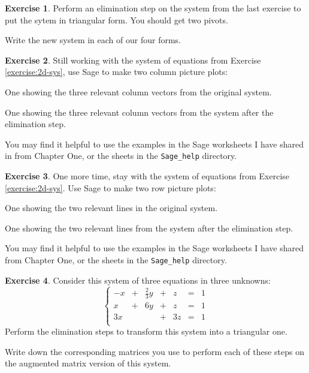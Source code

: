 \documentclass[11pt]{amsart}
\theoremstyle{definition}
\newtheorem{exercise}{Exercise}
\begin{document}
\begin{exercise}
Perform an elimination step on the system from the last exercise to put the sytem in triangular form. You should get two pivots.

Write the new system in each of our four forms.
\end{exercise}



\begin{exercise}
Still working with the system of equations from Exercise \ref{exercise:2d-sys}, use Sage to make two column picture plots:
\begin{compactitem}
\item One showing the three relevant column vectors from the original system.

\item One showing the three relevant column vectors from the system after the elimination step.
\end{compactitem}

You may find it helpful to use the examples in the Sage worksheets I have shared in from Chapter One, or the sheets in the \texttt{Sage\_help} directory.
\end{exercise}


\begin{exercise}
One more time, stay with the system of equations from Exercise \ref{exercise:2d-sys}. Use Sage to make two row picture plots:
\begin{compactitem}
\item One showing the two relevant lines in the original system.

\item One showing the two relevant lines from the system after the elimination step.
\end{compactitem}

You may find it helpful to use the examples in the Sage worksheets I have shared from Chapter One, or the sheets in the \texttt{Sage\_help} directory.
\end{exercise}


\begin{exercise}\label{exercise:3d-sys}
Consider this system of three equations in three unknowns:
\[
\left\{
\begin{array}{rrrrrrr}
-x & + & \frac{2}{3} y & + & z & = & 1 \\
 x & + &            6y & + & z & = & 1 \\
3x &   &               & + & 3z& = & 1 \\
\end{array}\right.
\]
Perform the elimination steps to transform this system into a triangular one.

Write down the corresponding matrices you use to perform each of these steps on the augmented matrix version of this system.
\end{exercise}
\end{document}
